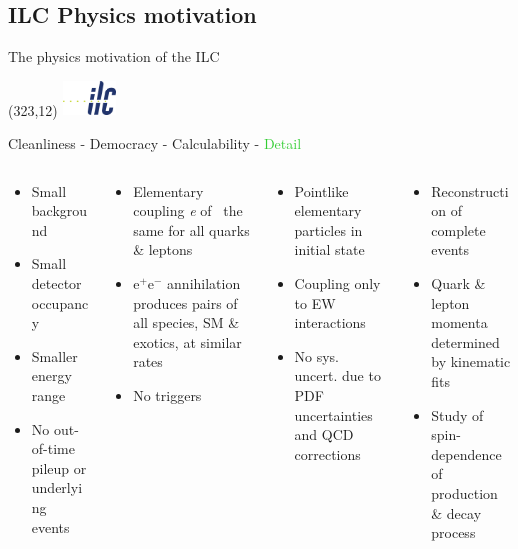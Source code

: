 \documentclass[xcolor={dvipsnames}]{beamer}
\newcommand{\ilclogo}{
  \setlength{\TPHorizModule}{1pt}
  \setlength{\TPVertModule}{1pt}
  \begin{textblock}{1}(323,12)
   \includegraphics[width=40pt,height=26pt]{figures/ILC.jpeg}
  \end{textblock}
}
\begin{document}
\subsection{ILC Physics motivation}
\begin{frame}[fragile]{The physics motivation of the ILC}
\ilclogo

\begin{block}{}
\centering
\textcolor{JungleGreen}{Cleanliness} - \textcolor{WildStrawberry}{Democracy} - \textcolor{Periwinkle}{Calculability} - \textcolor{LimeGreen}{Detail}
\end{block}

\begin{columns}
\begin{column}{0.24\textwidth}
\begin{itemize}
\color{JungleGreen}
\item Small background
\item Small detector occupancy
\item Smaller energy range
\item No out-of-time pileup or underlying events
\end{itemize}
\end{column}
\begin{column}{0.26\textwidth}
\begin{itemize}
\color{WildStrawberry}
\item Elementary coupling \textit{e} of \textgamma \, the same for all quarks \& leptons
\item e$^+$e$^-$ annihilation produces pairs of all species, SM \& exotics, at similar rates
\item No triggers
\end{itemize}
\end{column}
\begin{column}{0.27\textwidth}
\begin{itemize}
\color{Periwinkle}
\item Pointlike elementary particles in initial state
\item Coupling only to EW interactions
\item No sys. uncert. due to PDF uncertainties and QCD corrections
\end{itemize}
\end{column}
\begin{column}{0.27\textwidth}
\begin{itemize}
\color{LimeGreen}
\item Reconstruction of complete events
\item Quark \& lepton momenta determined by kinematic fits
\item Study of spin-dependence of production \& decay process
\end{itemize}
\end{column}
\end{columns}

\end{frame}
\end{document}
